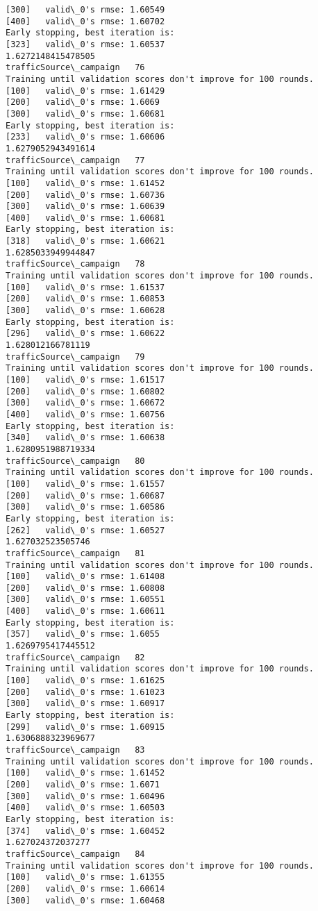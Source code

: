 \documentclass[11pt]{article}
\begin{document}
\begin{Verbatim}[commandchars=\\\{\}]
[300]	valid\_0's rmse: 1.60549
[400]	valid\_0's rmse: 1.60702
Early stopping, best iteration is:
[323]	valid\_0's rmse: 1.60537
1.6272148415478505
trafficSource\_campaign   76
Training until validation scores don't improve for 100 rounds.
[100]	valid\_0's rmse: 1.61429
[200]	valid\_0's rmse: 1.6069
[300]	valid\_0's rmse: 1.60681
Early stopping, best iteration is:
[233]	valid\_0's rmse: 1.60606
1.6279052943491614
trafficSource\_campaign   77
Training until validation scores don't improve for 100 rounds.
[100]	valid\_0's rmse: 1.61452
[200]	valid\_0's rmse: 1.60736
[300]	valid\_0's rmse: 1.60639
[400]	valid\_0's rmse: 1.60681
Early stopping, best iteration is:
[318]	valid\_0's rmse: 1.60621
1.6285033949944847
trafficSource\_campaign   78
Training until validation scores don't improve for 100 rounds.
[100]	valid\_0's rmse: 1.61537
[200]	valid\_0's rmse: 1.60853
[300]	valid\_0's rmse: 1.60628
Early stopping, best iteration is:
[296]	valid\_0's rmse: 1.60622
1.628012166781119
trafficSource\_campaign   79
Training until validation scores don't improve for 100 rounds.
[100]	valid\_0's rmse: 1.61517
[200]	valid\_0's rmse: 1.60802
[300]	valid\_0's rmse: 1.60672
[400]	valid\_0's rmse: 1.60756
Early stopping, best iteration is:
[340]	valid\_0's rmse: 1.60638
1.6280951988719334
trafficSource\_campaign   80
Training until validation scores don't improve for 100 rounds.
[100]	valid\_0's rmse: 1.61557
[200]	valid\_0's rmse: 1.60687
[300]	valid\_0's rmse: 1.60586
Early stopping, best iteration is:
[262]	valid\_0's rmse: 1.60527
1.627032523505746
trafficSource\_campaign   81
Training until validation scores don't improve for 100 rounds.
[100]	valid\_0's rmse: 1.61408
[200]	valid\_0's rmse: 1.60808
[300]	valid\_0's rmse: 1.60551
[400]	valid\_0's rmse: 1.60611
Early stopping, best iteration is:
[357]	valid\_0's rmse: 1.6055
1.6269795417445512
trafficSource\_campaign   82
Training until validation scores don't improve for 100 rounds.
[100]	valid\_0's rmse: 1.61625
[200]	valid\_0's rmse: 1.61023
[300]	valid\_0's rmse: 1.60917
Early stopping, best iteration is:
[299]	valid\_0's rmse: 1.60915
1.6306888323969677
trafficSource\_campaign   83
Training until validation scores don't improve for 100 rounds.
[100]	valid\_0's rmse: 1.61452
[200]	valid\_0's rmse: 1.6071
[300]	valid\_0's rmse: 1.60496
[400]	valid\_0's rmse: 1.60503
Early stopping, best iteration is:
[374]	valid\_0's rmse: 1.60452
1.627024372037277
trafficSource\_campaign   84
Training until validation scores don't improve for 100 rounds.
[100]	valid\_0's rmse: 1.61355
[200]	valid\_0's rmse: 1.60614
[300]	valid\_0's rmse: 1.60468

\end{Verbatim}
\end{document}
